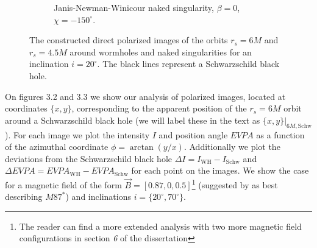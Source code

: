\documentclass[12pt]{article}
\numberwithin{equation}{section}
\numberwithin{figure}{section}
\begin{document}
\begin{figure}[!htb]
\begin{subfigure}{7cm}
			\caption{Janis-Newman-Winicour naked singularity, $\beta = 0$, $\chi = -150^\circ$.}
		\end{subfigure}
		\caption[The direct polarized images around wormholes and naked singularities for a vertical magnetic field.]{\small
			The constructed direct polarized images of the orbits $r_s = 6M$ and $r_s = 4.5M$ around wormholes and naked singularities for an inclination  $i = 20^\circ$. The black lines represent a Schwarzschild black hole.} 
		\label{pol_vert_field}
	\end{figure}
	
	On figures 3.2 and 3.3 we show our analysis of polarized images, located at coordinates $\{x,y\}$, corresponding to the apparent position of the  $r_s = 6M$ orbit around a Schwarzschild black hole (we will label these in the text as $\{x,y\}\vert_{6M, \text{Schw}}$). For each image we plot the intensity $I$ and position angle $EVPA$ as a function of the azimuthal coordinate $\phi = \arctan(y / x)$. Additionally we plot the deviations from the Schwarzschild black hole $\Delta I = I_{\text{WH}} - I_{\text{Schw}}$ and $\Delta EVPA = EVPA_\text{WH} - EVPA_\text{Schw}$ for each point on the images. We show the case for a magnetic field of the form $\vec{B} = [0.87, 0, 0.5]$\footnote{The reader can find a more extended analysis with two more magnetic field configurations in section \emph{6} of the dissertation} (suggested by \cite{Narayan2021} as best describing $M87^*$) and inclinations $i = \{20^\circ, 70^\circ\}$.
	
	\newpage
	
\end{document}
